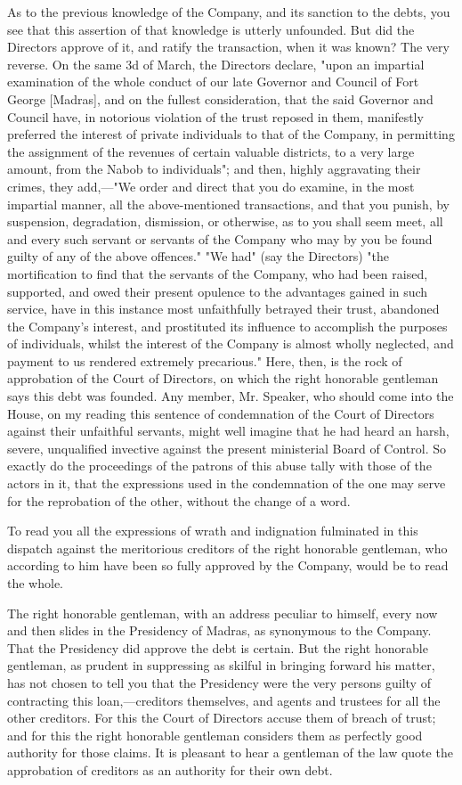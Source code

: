 As to the previous knowledge of the Company, and its sanction to the debts, you see that this assertion of that knowledge is utterly unfounded. But did the Directors approve of it, and ratify the transaction, when it was known? The very reverse. On the same 3d of March, the Directors declare, "upon an impartial examination of the whole conduct of our late Governor and Council of Fort George [Madras], and on the fullest consideration, that the said Governor and Council have, in notorious violation of the trust reposed in them, manifestly preferred the interest of private individuals to that of the Company, in permitting the assignment of the revenues of certain valuable districts, to a very large amount, from the Nabob to individuals"; and then, highly aggravating their crimes, they add,—"We order and direct that you do examine, in the most impartial manner, all the above-mentioned transactions, and that you punish, by suspension, degradation, dismission, or otherwise, as to you shall seem meet, all and every such servant or servants of the Company who may by you be found guilty of any of the above offences." "We had" (say the Directors) "the mortification to find that the servants of the Company, who had been raised, supported, and owed their present opulence to the advantages gained in such service, have in this instance most unfaithfully betrayed their trust, abandoned the Company's interest, and prostituted its influence to accomplish the purposes of individuals, whilst the interest of the Company is almost wholly neglected, and payment to us rendered extremely precarious." Here, then, is the rock of approbation of the Court of Directors, on which the right honorable gentleman says this debt was founded. Any member, Mr. Speaker, who should come into the House, on my reading this sentence of condemnation of the Court of Directors against their unfaithful servants, might well imagine that he had heard an harsh, severe, unqualified invective against the present ministerial Board of Control. So exactly do the proceedings of the patrons of this abuse tally with those of the actors in it, that the expressions used in the condemnation of the one may serve for the reprobation of the other, without the change of a word.

To read you all the expressions of wrath and indignation fulminated in this dispatch against the meritorious creditors of the right honorable gentleman, who according to him have been so fully approved by the Company, would be to read the whole.

The right honorable gentleman, with an address peculiar to himself, every now and then slides in the Presidency of Madras, as synonymous to the Company. That the Presidency did approve the debt is certain. But the right honorable gentleman, as prudent in suppressing as skilful in bringing forward his matter, has not chosen to tell you that the Presidency were the very persons guilty of contracting this loan,—creditors themselves, and agents and trustees for all the other creditors. For this the Court of Directors accuse them of breach of trust; and for this the right honorable gentleman considers them as perfectly good authority for those claims. It is pleasant to hear a gentleman of the law quote the approbation of creditors as an authority for their own debt.

